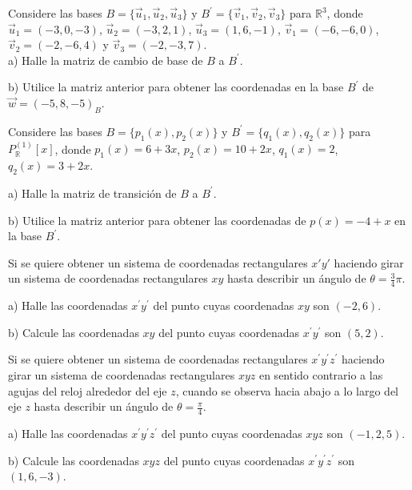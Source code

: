 \begin{exercise}
\item

Considere las bases $B=\{ \vec{u}_1,\vec{u}_2, \vec{u}_3\}$  y $B^\prime=\{ \vec{v}_1,\vec{v}_2,
\vec{v}_3\}$ para $ \mathbb{R}^3$, donde  $\vec{u}_1=(-3,0,-3)$,
$\vec{u}_2=(-3,2,1)$, $ \vec{u}_3=(1,6,-1)$, $ \vec{v}_1=(-6,-6,0)$, $\vec{v}_2=(-2,-6,4)$ y
$\vec{v}_3=(-2,-3,7)$.\\

a) Halle la matriz de cambio de base de $B$ a $B^\prime$.


b) Utilice la matriz anterior para obtener las coordenadas en la base
$B^\prime$ de $\vec{w}=(-5, 8, -5)_{B}$.
\end{exercise}



\begin{exercise}
\item

Considere las bases $B=\{ p_1(x),p_2(x)\}$  y $B^\prime=\{ q_1(x),q_2(x)\}$ para
$P^{(1)}_{\mathbb{R}}[x]$, donde  $p_1(x)=6+3x$, $p_2(x)=10+2x$, $q_1(x)=2$, $q_2(x)=3+2x$.

a) Halle la matriz de transición de $B$ a $B^\prime$.

b) Utilice la matriz anterior para obtener las coordenadas de $p(x)=-4+x$
en la base $B^\prime$.\\
\end{exercise}



\begin{exercise}
\item

Si se quiere obtener un sistema de coordenadas rectangulares
$x'y'$ haciendo girar un sistema de coordenadas rectangulares $xy$ hasta
describir un ángulo de $\theta= \frac {3 }{4} \pi$.

a) Halle las coordenadas $x^\prime y^\prime$ del punto cuyas coordenadas $xy$
son $(-2,6)$.

b) Calcule las coordenadas $xy$ del punto cuyas coordenadas $x^\prime y^\prime$
son $(5,2)$.

\end{exercise}

\begin{exercise}
\item

Si se quiere obtener un sistema de coordenadas rectangulares
$x^\prime y^\prime z^\prime$ haciendo girar un sistema de coordenadas rectangulares $xyz$ en sentido
contrario a las agujas del reloj alrededor del eje $z$, cuando se
observa hacia abajo a lo largo del eje $z$ hasta describir un
ángulo de $\theta= \frac {\pi}{4}$.

a) Halle las coordenadas $x^\prime y^\prime z^\prime$ del punto cuyas coordenadas
$xyz$ son $(-1,2,5)$.

b) Calcule las coordenadas $xyz$ del punto cuyas coordenadas
$x^\prime y^\prime z^\prime$ son $(1,6,-3)$.

\end{exercise}



